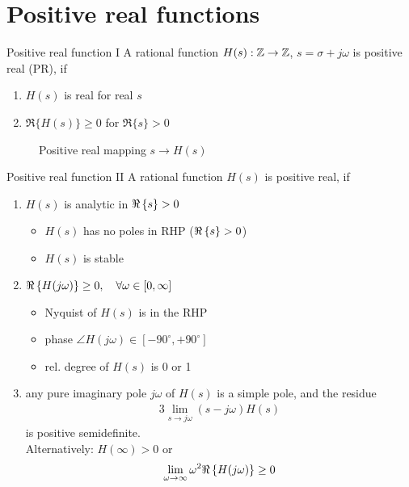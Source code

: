 \section{Positive real functions}
\begin{definition}{Positive real function I}
A rational function $H(s): \mathbb{Z} \rightarrow \mathbb{Z}$, $s = \sigma + j\omega$ is
positive real (PR), if
\begin{enumerate}[label=(\roman*)]
\item {} $H(s)$ is real for real $s$ 
\item {} $\Re\{H(s)\} \geq 0$ for  $\Re\{s\} > 0$
\end{enumerate}

\begin{figure}[H]
    \centering
    \caption{Positive real mapping $s \rightarrow H(s)$}
    \label{fig:positive-real-mapping}
\end{figure}

\end{definition}

\begin{definition}{Positive real function II}
A rational function $H(s)$ is positive real, if
    \begin{enumerate}[label=(\roman*)]
    \item $H(s)$ is analytic
     in $\Re\left\{s\right\} >0$ 
        \begin{itemize}
        \item $H(s)$ has no poles in RHP ($\Re\left\{s\right\} > 0$)
        \item $H(s)$ is stable
        \end{itemize}
    \item $\Re\left\{H(j\omega)\right\} \geq 0, \quad \forall\omega \in [0, \infty]$    
        \begin{itemize}
            \item Nyquist of $H(s)$ is in the RHP
            \item phase $\angle H(j\omega) \in [-90^{\circ}, +90^{\circ}]$
            \item rel. degree of $H(s)$ is 0 or 1
        \end{itemize}
    \item any pure imaginary pole $j\omega$ of $H(s)$ is
        a simple pole, and the residue
    \begin{alignat*}{3}
    \lim_{s \rightarrow j\omega} \left( s - j\omega \right) H(s)
    \end{alignat*}
        is positive semidefinite.\\

        Alternatively: $H(\infty) > 0$ or 
    \begin{alignat*}{3}
        \lim_{\omega \rightarrow \infty} \omega^2 \Re\left\{H(j\omega)\right\} \geq 0
    \end{alignat*}
    \end{enumerate}
\end{definition}~

